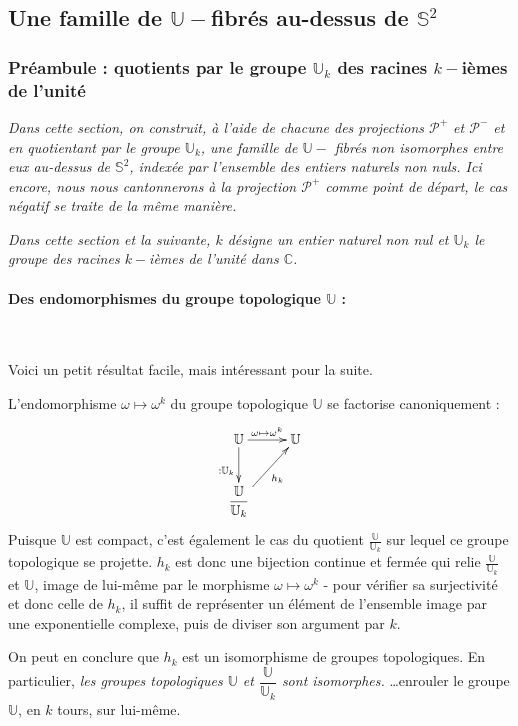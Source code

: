 \subsection{Une famille de $\mathbb{U}-$fibr\'es au-dessus de $\mathbb{S}^2$}

\subsubsection{Pr\'eambule : quotients par le groupe $\mathbb{U}_k$ des racines $k-$i\`emes de l'unit\'e}\label{ltk}

\textit{%
Dans cette section, on construit, \`a l'aide de chacune des projections $\mathcal{P}^+$ et $\mathcal{P}^-$ et en quotientant par le groupe $\mathbb{U}_k$, %
une famille de $\mathbb{U}-$ fibr\'es non isomorphes entre eux au-dessus de $\mathbb{S}^2$, index\'ee par l'ensemble des entiers naturels non nuls. %
Ici encore, nous nous cantonnerons \`a la projection $\mathcal{P}^+$ comme point de d\'epart, le cas \og{}n\'egatif\fg{} se traite de la m\^eme mani\`ere.%
}

\emph{Dans cette section et la suivante, $k$ d\'esigne un entier naturel non nul et $\mathbb{U}_k$ le groupe des racines $k-$i\`emes de l'unit\'e dans $\mathbb{C}$.}

\paragraph{Des endomorphismes du groupe topologique $\mathbb{U}$ :}~\\

\par
Voici un petit r\'esultat facile, mais int\'eressant pour la suite.
\par
L'endomorphisme $\omega\mapsto\omega^k$ du groupe topologique $\mathbb{U}$ se factorise canoniquement :
\[\xymatrix{%
\mathbb{U} \ar[r]^{\omega\mapsto\omega^k} \ar[d]_{:\mathbb{U}_k}&\mathbb{U}\\%
\dfrac{\mathbb{U}}{\mathbb{U}_k} \ar[ru]_{h_k}&%
}\]%
Puisque $\mathbb{U}$ est compact, c'est \'egalement le cas du quotient $\frac{\mathbb{U}}{\mathbb{U}_k}$ sur lequel ce groupe topologique se projette. %
$h_k$ est donc une bijection continue et ferm\'ee qui relie $\frac{\mathbb{U}}{\mathbb{U}_k}$ et $\mathbb{U}$, %
image de lui-m\^eme par le morphisme $\omega\mapsto\omega^k$ - pour v\'erifier sa surjectivit\'e et donc celle de $h_k$, il suffit de repr\'esenter un \'el\'ement de l'ensemble image par une exponentielle complexe, %
puis de diviser son argument par $k$.
\par
On peut en conclure que $h_k$ est un isomorphisme de groupes topologiques. En particulier, %
\emph{%
les groupes topologiques $\mathbb{U}$ et $\dfrac{\mathbb{U}}{\mathbb{U}_k}$ sont isomorphes.%
}
\ligneinter
\dots enrouler le groupe $\mathbb{U}$, en $k$ tours, sur lui-m\^eme.

